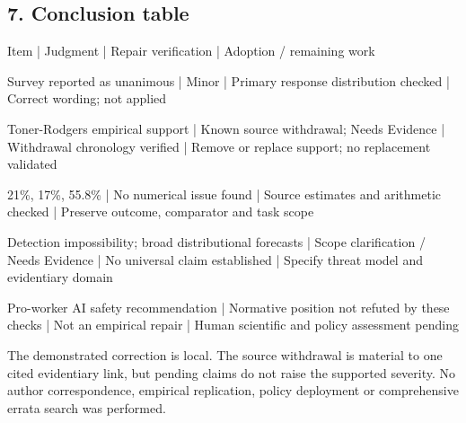 \documentclass[10pt]{article}
\begin{document}
\subsection*{7. Conclusion table}
Item | Judgment | Repair verification | Adoption / remaining work\par
Survey reported as unanimous | Minor | Primary response distribution checked | Correct wording; not applied\par
Toner-Rodgers empirical support | Known source withdrawal; Needs Evidence | Withdrawal chronology verified | Remove or replace support; no replacement validated\par
21\%, 17\%, 55.8\% | No numerical issue found | Source estimates and arithmetic checked | Preserve outcome, comparator and task scope\par
Detection impossibility; broad distributional forecasts | Scope clarification / Needs Evidence | No universal claim established | Specify threat model and evidentiary domain\par
Pro-worker AI safety recommendation | Normative position not refuted by these checks | Not an empirical repair | Human scientific and policy assessment pending\par
The demonstrated correction is local. The source withdrawal is material to one cited evidentiary link, but pending claims do not raise the supported severity. No author correspondence, empirical replication, policy deployment or comprehensive errata search was performed.\par
\end{document}
